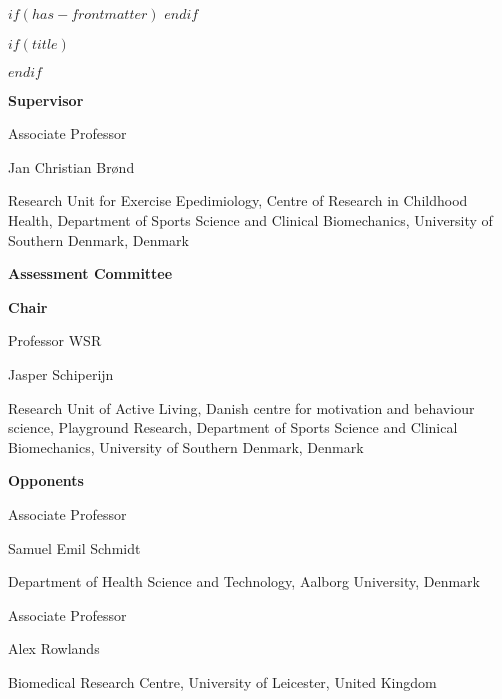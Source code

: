 $if(has-frontmatter)$
  \frontmatter
$endif$
  
  $if(title)$
  \maketitle
$endif$




\newpage

\textcolor{color1}{\textsf{\textbf{\Large{Supervisor}}}}

\vspace*{\baselineskip}

Associate Professor 

Jan Christian Brønd

Research Unit for Exercise Epedimiology, Centre of Research in Childhood Health, Department of Sports Science and Clinical Biomechanics, University of Southern Denmark, Denmark

\vspace{2cm}

\textcolor{color1}{\textsf{\textbf{\Large{Assessment Committee}}}}

\vspace*{\baselineskip}

\textcolor{color1}{\textbf{Chair}}

Professor WSR 

Jasper Schiperijn

Research Unit of Active Living, Danish centre for motivation and behaviour science, Playground Research, Department of Sports Science and Clinical Biomechanics, University of Southern Denmark, Denmark

\bigskip

\textcolor{color1}{\textbf{Opponents}}

\begin{multicols}{2}

Associate Professor 

Samuel Emil Schmidt

Department of Health Science and Technology, Aalborg University, Denmark

\columnbreak

Associate Professor 

Alex Rowlands

Biomedical Research Centre, \newline University of Leicester, United Kingdom

\end{multicols}

